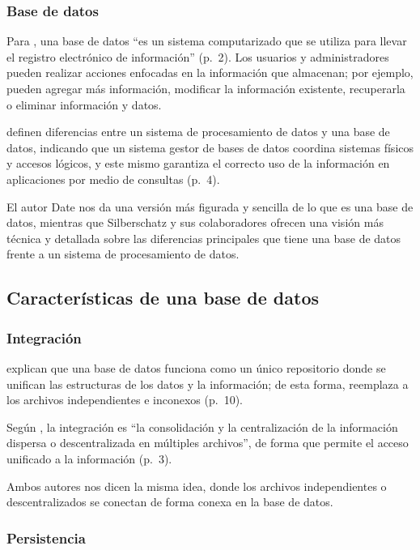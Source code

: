 \subsubsection{Base de datos}

Para \textcite{date_intro_bd}, una base de datos \enquote{es un sistema computarizado que se utiliza para llevar el registro electrónico de información} (p.~2). Los usuarios y administradores pueden realizar acciones enfocadas en la información que almacenan; por ejemplo, pueden agregar más información, modificar la información existente, recuperarla o eliminar información y datos.

\textcite{silberschatz_dbconcepts} definen diferencias entre un sistema de procesamiento de datos y una base de datos, indicando que un sistema gestor de bases de datos coordina sistemas físicos y accesos lógicos, y este mismo garantiza el correcto uso de la información en aplicaciones por medio de consultas (p.~4).

El autor Date nos da una versión más figurada y sencilla de lo que es una base de datos, mientras que Silberschatz y sus colaboradores ofrecen una visión más técnica y detallada sobre las diferencias principales que tiene una base de datos frente a un sistema de procesamiento de datos.

\subsection{Características de una base de datos}

\subsubsection{Integración}

\textcite{elmasri_navathe} explican que una base de datos funciona como un único repositorio donde se unifican las estructuras de los datos y la información; de esta forma, reemplaza a los archivos independientes e inconexos (p.~10).

Según \textcite{silberschatz_dbconcepts}, la integración es \enquote{la consolidación y la centralización de la información dispersa o descentralizada en múltiples archivos}, de forma que permite el acceso unificado a la información (p.~3).

Ambos autores nos dicen la misma idea, donde los archivos independientes o descentralizados se conectan de forma conexa en la base de datos.

\subsubsection{Persistencia}

